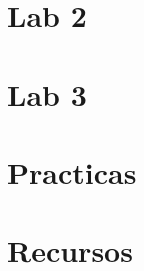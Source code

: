\documentclass[12pt, twoside, openright]{report} %
\begin{document}
\part{Lab 2}



\part{Lab 3}



\part{Practicas}









\part{Recursos}

\end{document}
